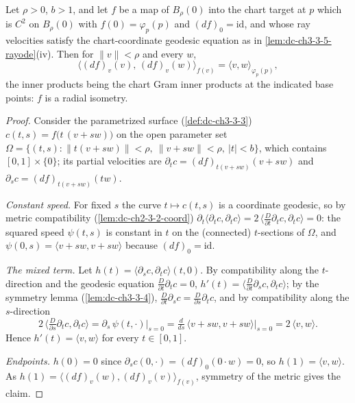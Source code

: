 \begin{lemma}
  \label{lem:dc-ch3-3-5-surface}


  Let $\rho > 0$, $b > 1$, and let $f$ be a map of $B_\rho(0)$ into the chart
  target at $p$ which is $C^2$ on $B_\rho(0)$ with $f(0) = \varphi_p(p)$ and
  $(df)_0 = \mathrm{id}$, and whose ray velocities satisfy the
  chart-coordinate geodesic equation as in \cref{lem:dc-ch3-3-5-rayode}(iv).
  Then for $\|v\| < \rho$ and every $w$,
  $$\big\langle (df)_v(v),\, (df)_v(w) \big\rangle_{f(v)}
    = \langle v, w\rangle_{\varphi_p(p)},$$
  the inner products being the chart Gram inner products at the indicated
  base points: $f$ is a radial isometry.
\end{lemma}
\begin{proof}
  \sketch

  Consider the parametrized surface (\cref{def:dc-ch3-3-3})
  $c(t,s) = f\big(t\,(v + s w)\big)$ on the open parameter set
  $\Omega = \{(t,s) : \|t(v+sw)\| < \rho,\ \|v+sw\| < \rho,\ |t| < b\}$,
  which contains $[0,1] \times \{0\}$; its partial velocities are
  $\partial_t c = (df)_{t(v+sw)}(v+sw)$ and $\partial_s c = (df)_{t(v+sw)}(tw)$.

  \emph{Constant speed.} For fixed $s$ the curve $t \mapsto c(t,s)$ is a
  coordinate geodesic, so by metric compatibility
  (\cref{lem:dc-ch2-3-2-coord})
  $\partial_t \langle \partial_t c, \partial_t c\rangle
  = 2\,\langle \tfrac{D}{\partial t}\partial_t c, \partial_t c\rangle = 0$:
  the squared speed $\psi(t,s)$ is constant in $t$ on the (connected)
  $t$-sections of $\Omega$, and $\psi(0,s) = \langle v+sw, v+sw\rangle$
  because $(df)_0 = \mathrm{id}$.

  \emph{The mixed term.} Let
  $h(t) = \langle \partial_s c, \partial_t c\rangle(t,0)$. By compatibility
  along the $t$-direction and the geodesic equation
  $\tfrac{D}{\partial t}\partial_t c = 0$,
  $h'(t) = \langle \tfrac{D}{\partial t}\partial_s c, \partial_t c\rangle$;
  by the symmetry lemma (\cref{lem:dc-ch3-3-4}),
  $\tfrac{D}{\partial t}\partial_s c = \tfrac{D}{\partial s}\partial_t c$,
  and by compatibility along the $s$-direction
  $$2\,\big\langle \tfrac{D}{\partial s}\partial_t c, \partial_t c\big\rangle
    = \partial_s\, \psi(t, \cdot)\big|_{s=0}
    = \tfrac{d}{ds}\,\langle v+sw, v+sw\rangle\big|_{s=0}
    = 2\,\langle v, w\rangle.$$
  Hence $h'(t) = \langle v, w\rangle$ for every $t \in [0,1]$.

  \emph{Endpoints.} $h(0) = 0$ since
  $\partial_s c(0, \cdot) = (df)_0(0 \cdot w) = 0$, so
  $h(1) = \langle v, w\rangle$. As
  $h(1) = \langle (df)_v(w), (df)_v(v)\rangle_{f(v)}$, symmetry of the
  metric gives the claim.
\end{proof}

